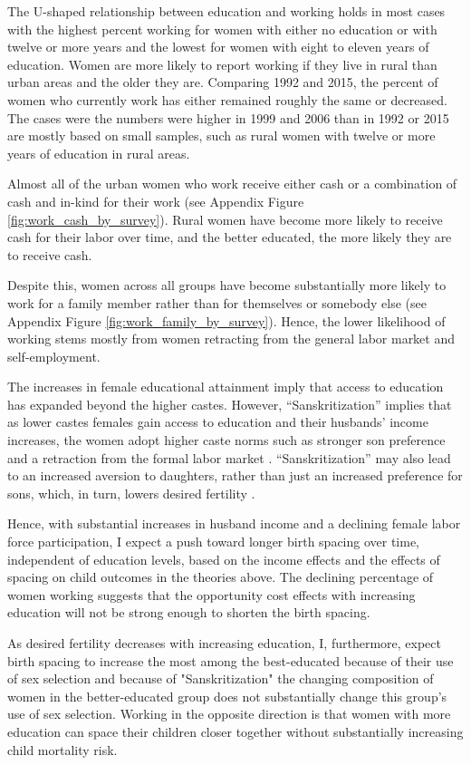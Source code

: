 \documentclass[12pt,letterpaper]{article}
\begin{document}
The U-shaped relationship between education and working holds in most cases with 
the highest percent working for women with either no education or with twelve or 
more years and the lowest for women with eight to eleven years of education.
Women are more likely to report working if they live in rural than urban areas 
and the older they are.
Comparing 1992 and 2015, the percent of women who currently work has either 
remained roughly the same or decreased.
The cases were the numbers were higher in 1999 and 2006 than in 1992 or 2015 
are mostly based on small samples, such as rural women with twelve or more 
years of education in rural areas.

Almost all of the urban women who work receive either cash or a combination of 
cash and in-kind for their work (see Appendix Figure \ref{fig:work_cash_by_survey}). 
Rural women have become more likely to receive cash for their labor over time, 
and the better educated, the more likely they are to receive cash.

Despite this, women across all groups have become substantially more likely to 
work for a family member rather than for themselves or somebody else
(see Appendix Figure \ref{fig:work_family_by_survey}).
Hence, the lower likelihood of working stems mostly from women retracting from 
the general labor market and self-employment.

The increases in female educational attainment imply that access to education 
has expanded beyond the higher castes. 
However, ``Sanskritization'' implies that as lower castes females gain access to 
education and their husbands' income increases, the women adopt higher caste 
norms such as stronger son preference and a retraction from the formal labor 
market \citep{Srinivas1956,Chen1995,Abraham2013,Chatterjee2018}. 
``Sanskritization'' may also lead to an increased aversion to daughters, rather 
than just an increased preference for sons, which, in turn, lowers desired 
fertility \citep{Borooah2004}.

Hence, with substantial increases in husband income and a declining female labor force 
participation, I expect a push toward longer birth spacing over time, independent
of education levels, based on the income effects and the effects of spacing
on child outcomes in the theories above.
The declining percentage of women working suggests that the opportunity cost
effects with increasing education will not be strong enough to shorten the
birth spacing.

As desired fertility decreases with increasing education, I, furthermore, expect 
birth spacing to increase the most among the best-educated because of their 
use of sex selection and because of "Sanskritization" the changing composition 
of women in the better-educated group does not substantially change this 
group's use of sex selection.
Working in the opposite direction is that women with more education can space
their children closer together without substantially increasing child mortality risk.
\end{document}
